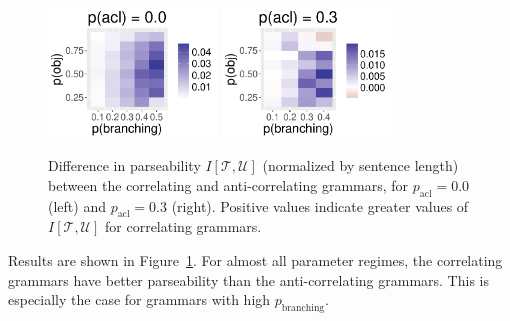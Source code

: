 \documentclass[10pt,twoside,lineno]{article}
\begin{document}
\begin{figure}
	\begin{center}	
\includegraphics[width=0.4\textwidth]{../models/revision/toy_simulations/result_NPBranching0_0.pdf}
\includegraphics[width=0.4\textwidth]{../models/revision/toy_simulations/result_NPBranching0_3.pdf}
\end{center}

	\caption{Difference in parseability $I[\mathcal{T}, \mathcal{U}]$ (normalized by sentence length) between the correlating and anti-correlating grammars, for $p_\text{acl} = 0.0$ (left) and $p_\text{acl} = 0.3$ (right). Positive values indicate greater values of $I[\mathcal{T}, \mathcal{U}]$ for correlating grammars.}\label{fig:toy-parseability}
\end{figure}


Results are shown in Figure~\ref{fig:toy-parseability}. For almost all parameter regimes, the correlating grammars have better parseability than the anti-correlating grammars. This is especially the case for grammars with high $p_\text{branching}$. 


\nocite{diessel2001ordering, dryer1980positional, wals} 




\end{document}
